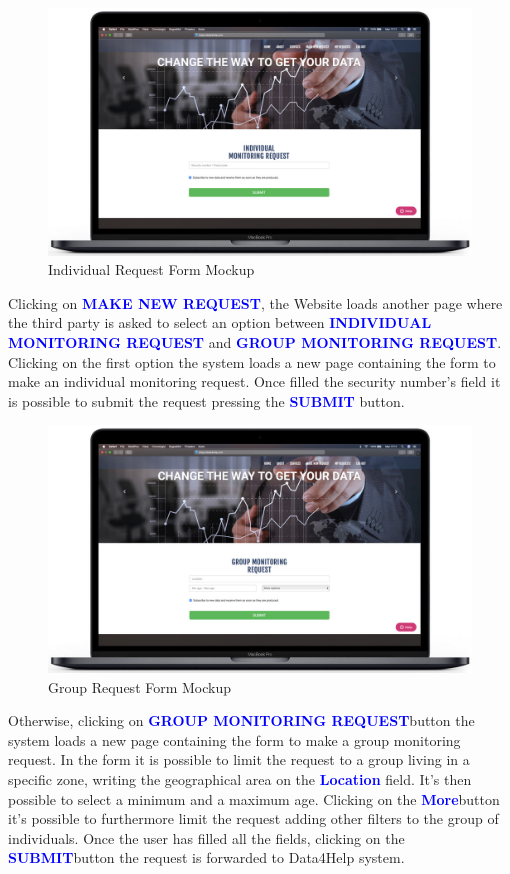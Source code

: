 \begin{enumerate}
\begin{figure}[H]
        \centering
          \includegraphics[scale = 0.33]{Images/Mockups/IndividualRequest.jpg}
          	\caption{Individual Request Form Mockup}
\end{figure}
Clicking on {\textcolor{Blue}{\textbf{MAKE NEW REQUEST}}}, the Website loads another page where the third party is asked to select an option between {\textcolor{Blue}{\textbf{INDIVIDUAL MONITORING REQUEST}}} and {\textcolor{Blue}{\textbf{GROUP MONITORING REQUEST}}}. Clicking on the first option the system loads a new page containing the form to make an individual monitoring request. Once filled the security number's field it is possible to submit the request pressing the {\textcolor{Blue}{\textbf{SUBMIT}}} button.
\clearpage

\begin{figure}[H]
        \centering
          \includegraphics[scale = 0.33]{Images/Mockups/GroupRequest.jpg}
          	\caption{Group Request Form Mockup}
\end{figure}
Otherwise, clicking on {\textcolor{Blue}{\textbf{GROUP MONITORING REQUEST}}}button the system loads a new page containing the form to make a group monitoring request. In the form it is possible to limit the request to a group living in a specific zone, writing the geographical area on the {\textcolor{Blue}{\textbf{Location}}} field. It's then possible to select a minimum and a maximum age. Clicking on the {\textcolor{Blue}{\textbf{More}}}button it's possible to furthermore limit the request adding other filters to the group of individuals. Once the user has filled all the fields, clicking on the {\textcolor{Blue}{\textbf{SUBMIT}}}button the request is forwarded to Data4Help system.
\clearpage


\end{enumerate}
